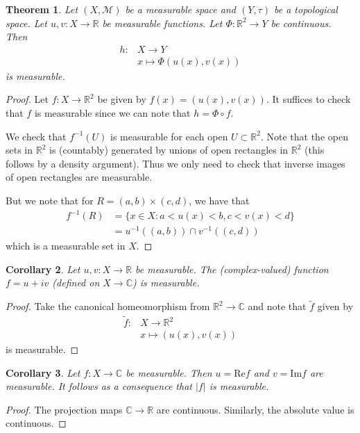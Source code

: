 \documentclass[11pt]{amsart}
\newtheorem{theorem}{Theorem}[section]
\newtheorem{corollary}[theorem]{Corollary}
\theoremstyle{definition}
\numberwithin{equation}{section}
\begin{document}
\begin{theorem}
    Let $(X,\mathcal M)$ be a measurable space and $(Y,\tau)$ be a topological space. Let $u,v:X\to\mathbb R$ be measurable functions. Let $\Phi:\mathbb R^2\to Y$ be continuous. Then
    \begin{align*}
        h:&X\to Y\\
        &x\mapsto\Phi(u(x),v(x))
    \end{align*}
    is measurable.
\end{theorem}
\begin{proof}
    Let $f:X\to\mathbb R^2$ be given by $f(x)=(u(x),v(x))$. It suffices to check that $f$ is measurable since we can note that $h=\Phi\circ f$.

    We check that $f^{-1}(U)$ is measurable for each open $U\subset \mathbb R^2$. Note that the open sets in $\mathbb R^2$ is (countably) generated by unions of open rectangles in $\mathbb R^2$ (this follows by a density argument). Thus we only need to check that inverse images of open rectangles are measurable.

    But we note that for $R=(a,b)\times(c,d)$, we have that
    \begin{align*}
        f^{-1}(R)&=\{x\in X:a<u(x)<b,c<v(x)<d\}\\
        &=u^{-1}((a,b))\cap v^{-1}((c,d))
    \end{align*}
    which is a measurable set in $X$.
\end{proof}
\begin{corollary}
    Let $u,v:X\to\mathbb R$ be measurable. The (complex-valued) function $f=u+iv$ (defined on $X\to\mathbb C$) is measurable.
\end{corollary}
\begin{proof}
    Take the canonical homeomorphism from $\mathbb R^2\to\mathbb C$ and note that $\tilde{f}$ given by 
    \begin{align*}
        \tilde{f}: &X\to\mathbb R^2\\
        &x\mapsto(u(x),v(x))
    \end{align*}
    is measurable.
\end{proof}
\begin{corollary}
    Let $f:X\to\mathbb C$ be measurable. Then $u=\mathrm{Re}f$ and $v=\mathrm{Im}f$ are measurable. It follows as a consequence that $|f|$ is measurable.
\end{corollary}
\begin{proof}
    The projection maps $\mathbb C\to\mathbb R$ are continuous. Similarly, the absolute value is continuous.
\end{proof}
\end{document}
